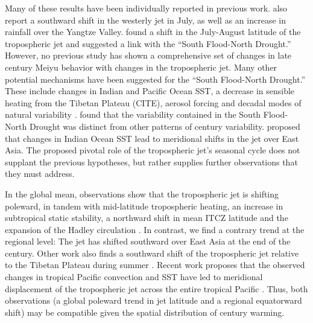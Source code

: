 \documentclass[draft,grl]{AGUTeX}
\begin{document}
\begin{article}
	Many of these results have been individually reported in previous work. \citet{Xuan2011} also report a southward shift in the westerly jet in July, as well as an increase in rainfall over the Yangtze Valley. \citet{Yu2004} found a shift in the July-August latitude of the tropospheric jet and suggested a link with the ``South Flood-North Drought.'' However,  no previous study has shown a comprehensive set of changes in late  century Meiyu behavior with changes in the tropospheric jet. Many other potential mechanisms have been suggested for the ``South Flood-North Drought.'' These include changes in Indian and Pacific Ocean SST,  a decrease in sensible heating from the Tibetan Plateau (CITE), aerosol forcing \citep{Song2014} and decadal modes of natural variability \citep{Zhang1999,Xin2006,Lei2014}. \cite{Zhou2009} found that the variability contained in the South Flood-North Drought was distinct from other patterns of  century variability. \citet{Qu2012} proposed that changes in Indian Ocean SST lead to meridional shifts in the jet over East Asia. The proposed pivotal role of the tropospheric jet's seasonal cycle does not supplant the previous hypotheses, but rather supplies further observations that they must address.
	
	 In the global mean, observations show that the tropospheric jet is shifting poleward, in tandem with mid-latitude tropospheric heating, an increase in subtropical static stability, a northward shift in mean ITCZ latitude and the expansion of the Hadley circulation \citep{Fu2006,Archer2008}. In contrast, we find a contrary trend at the regional level: The jet has shifted southward over East Asia at the end of the  century. Other work also finds a southward shift of the tropospheric jet relative to the Tibetan Plateau during summer \citep{Yu2007}. Recent work proposes that the observed changes in tropical Pacific convection and SST have led to meridional displacement of the tropospheric jet across the entire tropical Pacific \citep{Park2014a}. Thus, both observations (a global poleward trend in jet latitude and a regional equatorward shift) may be compatible given the spatial distribution of  century warming.
	 

\end{article}
\end{document}
